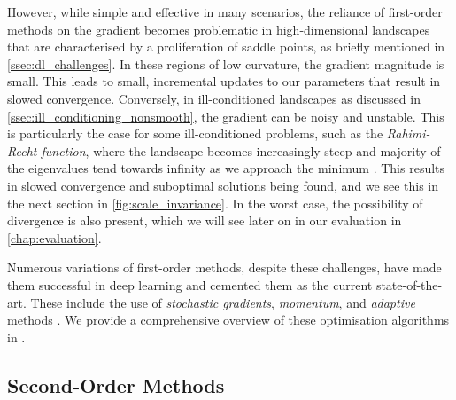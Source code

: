 However, while simple and effective in many scenarios, the reliance of first-order methods on the gradient becomes problematic in high-dimensional landscapes that are characterised by a proliferation of saddle points, as briefly mentioned in \cref{ssec:dl_challenges}. In these regions of low curvature, the gradient magnitude is small. This leads to small, incremental updates to our parameters that result in slowed convergence. Conversely, in ill-conditioned landscapes as discussed in \cref{ssec:ill_conditioning_nonsmooth}, the gradient can be noisy and unstable. 
This is particularly the case for some ill-conditioned problems, such as the \textit{Rahimi-Recht function}, where the landscape becomes increasingly steep and majority of the eigenvalues tend towards infinity as we approach the minimum \citep{recht2017kitchen}. This results in slowed convergence and suboptimal solutions being found, and we see this in the next section in \cref{fig:scale_invariance}. In the worst case, the possibility of divergence is also present, which we will see later on in our evaluation in \cref{chap:evaluation}. 

Numerous variations of first-order methods, despite these challenges, have made them successful in deep learning and cemented them as the current state-of-the-art. These include the use of \textit{stochastic gradients}, \textit{momentum}, and \textit{adaptive} methods \citep{monro1990stochastic, kingma2014adam}. We provide a comprehensive overview of these optimisation algorithms in .

\subsection{Second-Order Methods}
\label{ssec:second_order_methods}

